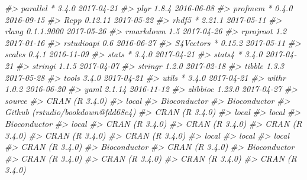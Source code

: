\documentclass[]{book}
\newenvironment{Shaded}{\begin{snugshade}}{\end{snugshade}}
\newcommand{\CommentTok}[1]{\textcolor[rgb]{0.56,0.35,0.01}{\textit{#1}}}
\begin{document}
\begin{Shaded}
\begin{Highlighting}[]
\CommentTok{#>  parallel           * 3.4.0      2017-04-21}
\CommentTok{#>  plyr                 1.8.4      2016-06-08}
\CommentTok{#>  profmem            * 0.4.0      2016-09-15}
\CommentTok{#>  Rcpp                 0.12.11    2017-05-22}
\CommentTok{#>  rhdf5              * 2.21.1     2017-05-11}
\CommentTok{#>  rlang                0.1.1.9000 2017-05-26}
\CommentTok{#>  rmarkdown            1.5        2017-04-26}
\CommentTok{#>  rprojroot            1.2        2017-01-16}
\CommentTok{#>  rstudioapi           0.6        2016-06-27}
\CommentTok{#>  S4Vectors          * 0.15.2     2017-05-11}
\CommentTok{#>  scales               0.4.1      2016-11-09}
\CommentTok{#>  stats              * 3.4.0      2017-04-21}
\CommentTok{#>  stats4             * 3.4.0      2017-04-21}
\CommentTok{#>  stringi              1.1.5      2017-04-07}
\CommentTok{#>  stringr              1.2.0      2017-02-18}
\CommentTok{#>  tibble               1.3.3      2017-05-28}
\CommentTok{#>  tools                3.4.0      2017-04-21}
\CommentTok{#>  utils              * 3.4.0      2017-04-21}
\CommentTok{#>  withr                1.0.2      2016-06-20}
\CommentTok{#>  yaml                 2.1.14     2016-11-12}
\CommentTok{#>  zlibbioc             1.23.0     2017-04-27}
\CommentTok{#>  source                           }
\CommentTok{#>  CRAN (R 3.4.0)                   }
\CommentTok{#>  local                            }
\CommentTok{#>  Bioconductor                     }
\CommentTok{#>  Bioconductor                     }
\CommentTok{#>  Github (rstudio/bookdown@fdd68e4)}
\CommentTok{#>  CRAN (R 3.4.0)                   }
\CommentTok{#>  local                            }
\CommentTok{#>  local                            }
\CommentTok{#>  Bioconductor                     }
\CommentTok{#>  local                            }
\CommentTok{#>  CRAN (R 3.4.0)                   }
\CommentTok{#>  CRAN (R 3.4.0)                   }
\CommentTok{#>  CRAN (R 3.4.0)                   }
\CommentTok{#>  CRAN (R 3.4.0)                   }
\CommentTok{#>  CRAN (R 3.4.0)                   }
\CommentTok{#>  local                            }
\CommentTok{#>  local                            }
\CommentTok{#>  local                            }
\CommentTok{#>  CRAN (R 3.4.0)                   }
\CommentTok{#>  Bioconductor                     }
\CommentTok{#>  CRAN (R 3.4.0)                   }
\CommentTok{#>  Bioconductor                     }
\CommentTok{#>  CRAN (R 3.4.0)                   }
\CommentTok{#>  CRAN (R 3.4.0)                   }
\CommentTok{#>  CRAN (R 3.4.0)                   }
\CommentTok{#>  CRAN (R 3.4.0)                   }

\end{Highlighting}
\end{Shaded}
\end{document}
